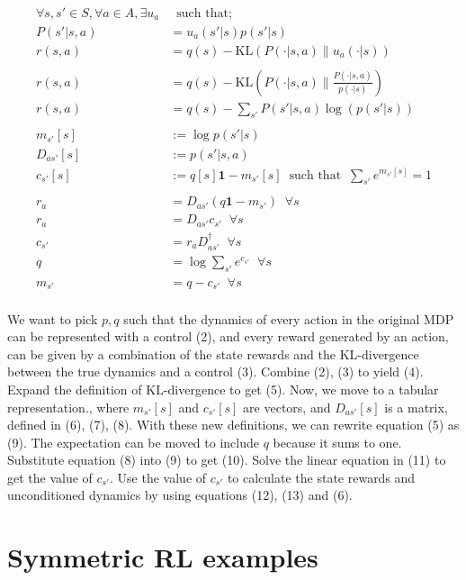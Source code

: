 \begin{align*}
\forall s, s' \in S, \forall a \in A, \exists u_a& \;\;\text{such that;} \tag{1}\\
P(s' | s, a) &= u_a(s'|s)p(s'|s) \tag{2}\\
r(s, a) &= q(s) - \text{KL}(P(\cdot | s, a) \parallel u_a(\cdot| s) ) \tag{3}\\
\\
r(s, a) &= q(s) - \text{KL}(P(\cdot | s, a)\parallel\frac{P(\cdot | s, a)}{p(\cdot|s)}) \tag{4}\\
r(s, a) &= q(s) - \sum_{s'}P(s' | s, a) \log(p(s'|s)) \tag{5}\\
\\
m_{s'}[s]&:= \log p(s' | s) \tag{6}\\
D_{as'}[s] &:= p(s'|s, a) \tag{7}\\
c_{s'}[s] &:= q[s] \mathbf 1 - m_{s'}[s] \;\;\text{such that} \;\; \sum_{s'} e^{m_{s'}[s]} = 1 \tag{8}\\
\\
r_a &= D_{as'} ( q \mathbf 1 - m_{s'}) \;\;\forall s \tag{9}\\
r_a &= D_{as'}c_{s'}  \;\;\forall s \tag{10}\\
c_{s'} &= r_aD_{as'}^{\dagger} \;\;\forall s\tag{11}\\
q &= \log \sum_{s'} e^{c_{s'}} \;\;\forall s\tag{12}\\
m_{s'} &= q - c_{s'} \;\;\forall s\tag{13}\\
\end{align*}

We want to pick $p, q$ such that the dynamics of every action in the original MDP can be represented with a control (2),
and every reward generated by an action, can be given by a combination of the
state rewards and the $\text{KL}$-divergence between the true dynamics and a control (3).
Combine (2), (3) to yield (4). Expand the definition of $\text{KL}$-divergence to get (5).
Now, we move to a tabular representation., where $m_{s'}[s]$ and $c_{s'}[s]$ are vectors, and
$D_{as'}[s]$ is a matrix, defined in (6), (7), (8). With these new definitions, we can rewrite equation (5)
as (9). The expectation can be moved to include $q$ because it sums to one.
Substitute equation (8) into (9) to get (10). Solve the linear equation in (11) to get the value of $c_{s'}$.
Use the value of $c_{s'}$ to calculate the state rewards and unconditioned dynamics by using equations (12), (13) and (6).

\section{Symmetric RL examples}

